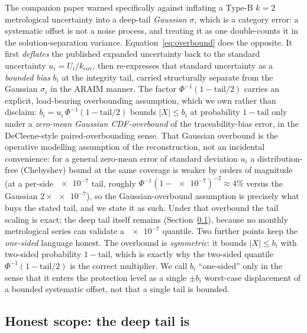 \begin{remark}
\label{rem:category}
The companion paper warned specifically against inflating a Type-B $k=2$
metrological uncertainty into a deep-tail \emph{Gaussian $\sigma$}, which is a
category error: a systematic offset is not a noise process, and treating it as one
double-counts it in the solution-separation variance. Equation~\eqref{eq:overbound}
does the opposite. It first \emph{deflates} the published expanded uncertainty back
to the standard uncertainty $u_i=U_i/k_{\mathrm{cov}}$, then re-expresses that
standard uncertainty as a \emph{bounded bias} $b_i$ at the integrity tail, carried
structurally separate from the Gaussian $\sigma_i$ in the ARAIM manner. The factor
$\Phi^{-1}(1-\mathrm{tail}/2)$ carries an explicit, load-bearing overbounding
assumption, which we own rather than disclaim: $b_i=u_i\,\Phi^{-1}(1-\mathrm{tail}/2)$
bounds $|X|\le b_i$ at probability $1-\mathrm{tail}$ only under a \emph{zero-mean
Gaussian CDF-overbound} of the traceability-bias error, in the DeCleene-style
paired-overbounding sense. That Gaussian overbound is the operative modelling
assumption of the reconstruction, not an incidental convenience: for a general
zero-mean error of standard deviation $u_i$ a distribution-free (Chebyshev) bound at
the same coverage is weaker by orders of magnitude (at a per-side $\num{e-7}$ tail,
roughly $\Phi^{-1}(1-\num{e-7})^{-2}\!\approx\!4\%$ versus the Gaussian
$2\times\num{e-7}$), so the Gaussian-overbound assumption is precisely what buys the
stated tail, and we state it as such. Under that overbound the tail scaling is exact;
the deep tail itself remains \Modelled{} (Section~\ref{sec:tracescope}), because no
monthly metrological series can validate a $\num{e-7}$ quantile. Two further points
keep the \emph{one-sided} language honest. The overbound is \emph{symmetric}: it
bounds $|X|\le b_i$ with two-sided probability $1-\mathrm{tail}$, which is exactly why
the two-sided quantile $\Phi^{-1}(1-\mathrm{tail}/2)$ is the correct multiplier. We
call $b_i$ ``one-sided'' only in the sense that it enters the protection level as a
single $\pm b_i$ worst-case displacement of a bounded systematic offset, not that a
single tail is bounded.
\end{remark}

\subsection{Honest scope: the deep tail is \Modelled{}}
\label{sec:tracescope}

